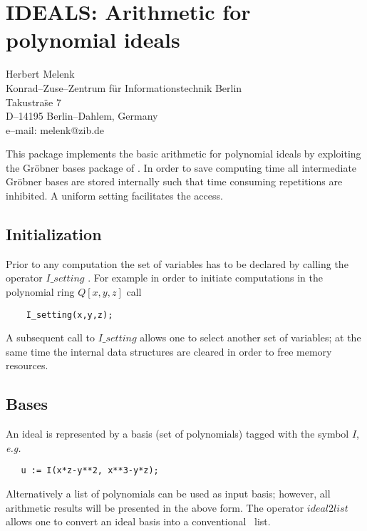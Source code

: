 \chapter{IDEALS: Arithmetic for polynomial ideals}
\label{IDEALS}

{\footnotesize
\begin{center}
Herbert Melenk \\
Konrad--Zuse--Zentrum f\"ur Informationstechnik Berlin \\
Takustra\"se 7 \\
D--14195 Berlin--Dahlem, Germany \\[0.05in]
e--mail: melenk@zib.de
\end{center}
}


This package implements the basic arithmetic for polynomial ideals
by exploiting the Gr\"obner bases package of \REDUCE.
In order to save computing time all intermediate Gr\"obner bases
are stored internally such that time consuming repetitions
are inhibited. A uniform setting facilitates the access.

\section{Initialization}

Prior to any computation the set of variables has to be declared
by calling the operator $I\_setting$ .  For example in order to initiate
computations in the polynomial ring $Q[x,y,z]$ call
\begin{verbatim}
    I_setting(x,y,z);
\end{verbatim}
A subsequent call to $I\_setting$ allows one to select another set
of variables; at the same time the internal data structures
are cleared in order to free memory resources.

\section{Bases}

An ideal is represented by a basis (set of polynomials) tagged
with the symbol $I$, {\em e.g.\ }
\begin{verbatim}
   u := I(x*z-y**2, x**3-y*z);
\end{verbatim}
Alternatively a list of polynomials can be used as input basis; however,
all arithmetic results will be presented in the above form. The
operator $ideal2list$ allows one to convert an ideal basis into a
conventional \REDUCE\ list.

